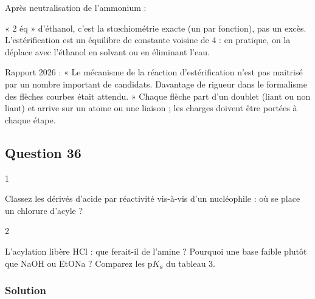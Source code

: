 \documentclass[11pt,a4paper]{article}
\newcommand{\equationajustee}[1]{%
  \sbox{\boiteequation}{$\displaystyle #1$}%
  \ifdim\wd\boiteequation>\linewidth
    \[\resizebox{\linewidth}{!}{\usebox{\boiteequation}}\]%
  \else
    \[#1\]%
  \fi}
\begin{document}
Après neutralisation de l'ammonium :

\equationajustee{\boxed{\mathbf F=\mathrm{EtO{-}CO{-}CH(NH_2){-}CO{-}OEt}}}

\begin{piege}

« 2 éq » d'éthanol, c'est la stœchiométrie exacte (un par fonction), pas un excès. L'estérification est un équilibre de constante voisine de 4 : en pratique, on la déplace avec l'éthanol en solvant ou en éliminant l'eau.

\end{piege}

\begin{jury}

Rapport 2026 : « Le mécanisme de la réaction d'estérification n'est pas maitrisé par un nombre important de candidats. Davantage de rigueur dans le formalisme des flèches courbes était attendu. » Chaque flèche part d'un doublet (liant ou non liant) et arrive sur un atome ou une liaison ; les charges doivent être portées à chaque étape.

\end{jury}

\hypertarget{question-36}{%
\subsection{Question 36}\label{question-36}}

\begin{indication}{1}

Classez les dérivés d'acide par réactivité vis-à-vis d'un nucléophile : où se place un chlorure d'acyle ?

\end{indication}

\begin{indication}{2}

L'acylation libère HCl : que ferait-il de l'amine ? Pourquoi une base faible plutôt que NaOH ou EtONa ? Comparez les \(\mathrm{p}K_a\) du tableau 3.

\end{indication}

\hypertarget{solution-35}{%
\subsubsection{Solution}\label{solution-35}}
\end{document}
